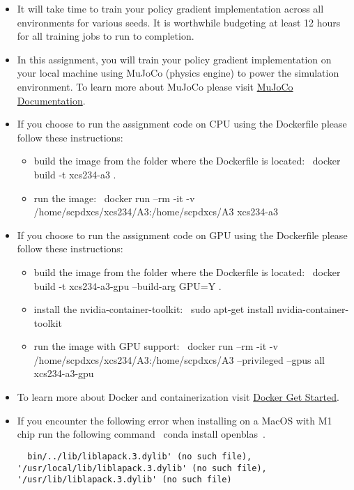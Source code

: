 \begin{itemize}
  \item It will take time to train your policy gradient implementation across all environments for various seeds. It is worthwhile budgeting at least 12 hours for all training jobs to run to completion.

  \item In this assignment, you will train your policy gradient implementation on your local machine using MuJoCo (physics engine) to power the simulation environment. To learn more about MuJoCo please visit \href{https://mujoco.readthedocs.io/en/latest/overview.html}{MuJoCo Documentation}.

  \item If you choose to run the assignment code on CPU using the Dockerfile please follow these instructions:
    \begin{itemize}
        \item build the image from the folder where the Dockerfile is located: ~docker build -t xcs234-a3 .~
        \item run the image:  ~docker run --rm -it -v /home/scpdxcs/xcs234/A3:/home/scpdxcs/A3 xcs234-a3~
    \end{itemize}

  \item If you choose to run the assignment code on GPU using the Dockerfile please follow these instructions:
    \begin{itemize}
        \item build the image from the folder where the Dockerfile is located: ~docker build -t xcs234-a3-gpu --build-arg GPU=Y .~
        \item install the nvidia-container-toolkit: ~sudo apt-get install nvidia-container-toolkit~
        \item run the image with GPU support: ~docker run --rm -it -v /home/scpdxcs/xcs234/A3:/home/scpdxcs/A3 --privileged --gpus all xcs234-a3-gpu~
    \end{itemize}

  \item To learn more about Docker and containerization visit \href{https://docs.docker.com/get-started/}{Docker Get Started}.

  \item If you encounter the following error when installing on a MacOS with M1 chip run the following command ~conda install openblas~.

  \begin{lstlisting}
  bin/../lib/liblapack.3.dylib' (no such file), '/usr/local/lib/liblapack.3.dylib' (no such file), '/usr/lib/liblapack.3.dylib' (no such file)
  \end{lstlisting}


\end{itemize}

